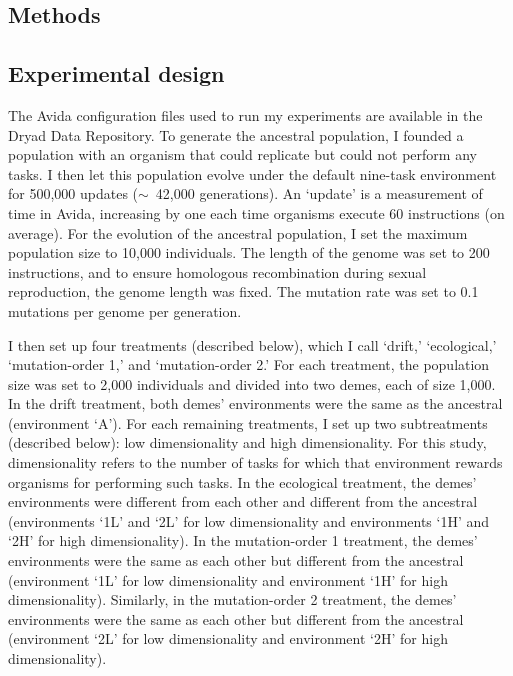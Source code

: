 \begin{doublespace}
\section{Methods}

\subsection{Experimental design}

The Avida configuration files used to run my experiments
are available in the Dryad Data Repository.
%
To generate the ancestral population,
I founded a population with an organism that could replicate
but could not perform any tasks.
%
I then let this population evolve under the default nine-task environment
for 500,000 updates ($\sim$~42,000 generations).
%
An `update' is a measurement of time in Avida, increasing by one each time
organisms execute 60 instructions (on average).
%
For the evolution of the ancestral population,
I set the maximum population size to 10,000 individuals.
%
The length of the genome was set to 200 instructions,
and to ensure homologous recombination
during sexual reproduction, the genome length was fixed.
%
The mutation rate was set to 0.1 mutations per genome per generation.



I then set up four treatments (described below), which I call
`drift,' `ecological,' `mu\-ta\-tion-or\-der 1,' and `mu\-ta\-tion-or\-der 2.'
%
For each treatment,
the population size was set to 2,000 individuals
and divided into two demes, each of size 1,000.
%
In the drift treatment, both demes' environments
were the same as the ancestral (environment `A').
%
For each remaining treatments,
I set up two subtreatments (described below):
low dimensionality and high dimensionality.
%
For this study, dimensionality refers to the number of tasks
for which that environment rewards organisms for performing such tasks.
%
In the ecological treatment, the demes' environments
were different from each other and different from the ancestral
(environments `1L' and `2L' for low dimensionality
and environments `1H' and `2H' for high dimensionality).
%
In the mutation-order 1 treatment,
the demes' environments were the same as each other
but different from the ancestral
(environment `1L' for low dimensionality
and environment `1H' for high dimensionality).
%
Similarly, in the mutation-order 2 treatment,
the demes' environments were the same as each other
but different from the ancestral
(environment `2L' for low dimensionality
and environment `2H' for high dimensionality).




\end{doublespace}
